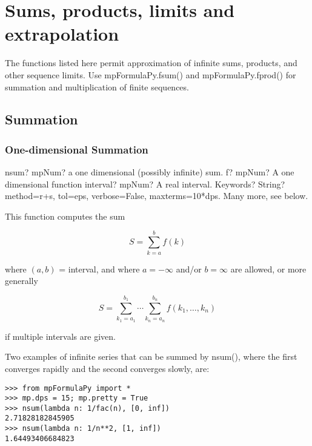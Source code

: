 \newpage
\chapter{Sums, products, limits and extrapolation}
The functions listed here permit approximation of infinite sums, products, and other sequence limits. Use mpFormulaPy.fsum() and mpFormulaPy.fprod() for summation and multiplication of finite sequences.


\section{Summation}


\subsection{One-dimensional Summation}

\begin{mpFunctionsExtract}
	\mpFunctionThree
	{nsum? mpNum? a one dimensional (possibly infinite) sum.}
	{f? mpNum? A one dimensional function}
	{interval? mpNum? A real interval.}	
	{Keywords? String? method=r+s, tol=eps, verbose=False, maxterms=10*dps. Many more, see below.}	
\end{mpFunctionsExtract}

\vpara
This function computes the sum

\begin{equation}
S = \sum_{k=a}^b f(k)
\end{equation}

where $(a,b)$ = interval, and where $a=-\infty$ and/or $b=\infty$ are allowed, or more generally

\begin{equation}
S = \sum_{k_1=a_1}^{b_1} \cdots \sum_{k_n=a_n}^{b_n} f(k_1,\ldots,k_n)
\end{equation}

if multiple intervals are given.

Two examples of infinite series that can be summed by nsum(), where the first converges rapidly and the second converges slowly, are:

\begin{lstlisting}
>>> from mpFormulaPy import *
>>> mp.dps = 15; mp.pretty = True
>>> nsum(lambda n: 1/fac(n), [0, inf])
2.71828182845905
>>> nsum(lambda n: 1/n**2, [1, inf])
1.64493406684823
\end{lstlisting}

